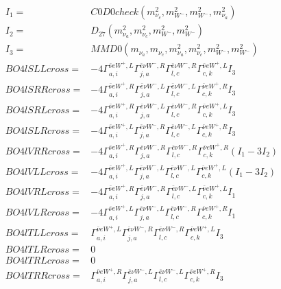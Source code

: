 \documentclass[A4,landscape]{article}
\begin{document}
\begin{align} 
I_1 = & C0D0check(m^2_{\nu_{{c}}}, m^2_{W^-}, m^2_{W^-}, m^2_{\nu_{{a}}}) \\ 
I_2 = & D_{27}(m^2_{\nu_{{a}}}, m^2_{\nu_{{c}}}, m^2_{W^-}, m^2_{W^-}) \\ 
I_3 = & MMD0(m_{\nu_{{a}}}, m_{\nu_{{c}}}, m^2_{\nu_{{a}}}, m^2_{\nu_{{c}}}, m^2_{W^-}, m^2_{W^-}) \\ 
  BO4lSLLcross= & -4  \Gamma^{\bar{\nu}e W^+,L}_{a, i} \Gamma^{\bar{e}\nu W^- ,R}_{j, a} \Gamma^{\bar{e}\nu W^- ,R}_{l, c} \Gamma^{\bar{\nu}e W^+,L}_{c, k} I_3 \\ 
  BO4lSRRcross= & -4  \Gamma^{\bar{\nu}e W^+,R}_{a, i} \Gamma^{\bar{e}\nu W^- ,L}_{j, a} \Gamma^{\bar{e}\nu W^- ,L}_{l, c} \Gamma^{\bar{\nu}e W^+,R}_{c, k} I_3 \\ 
  BO4lSRLcross= & -4  \Gamma^{\bar{\nu}e W^+,R}_{a, i} \Gamma^{\bar{e}\nu W^- ,L}_{j, a} \Gamma^{\bar{e}\nu W^- ,R}_{l, c} \Gamma^{\bar{\nu}e W^+,L}_{c, k} I_3 \\ 
  BO4lSLRcross= & -4  \Gamma^{\bar{\nu}e W^+,L}_{a, i} \Gamma^{\bar{e}\nu W^- ,R}_{j, a} \Gamma^{\bar{e}\nu W^- ,L}_{l, c} \Gamma^{\bar{\nu}e W^+,R}_{c, k} I_3 \\ 
  BO4lVRRcross= & -4  \Gamma^{\bar{\nu}e W^+,R}_{a, i} \Gamma^{\bar{e}\nu W^- ,R}_{j, a} \Gamma^{\bar{e}\nu W^- ,R}_{l, c} \Gamma^{\bar{\nu}e W^+,R}_{c, k} (I_1 - 3 I_2) \\ 
  BO4lVLLcross= & -4  \Gamma^{\bar{\nu}e W^+,L}_{a, i} \Gamma^{\bar{e}\nu W^- ,L}_{j, a} \Gamma^{\bar{e}\nu W^- ,L}_{l, c} \Gamma^{\bar{\nu}e W^+,L}_{c, k} (I_1 - 3 I_2) \\ 
  BO4lVRLcross= & -4  \Gamma^{\bar{\nu}e W^+,R}_{a, i} \Gamma^{\bar{e}\nu W^- ,R}_{j, a} \Gamma^{\bar{e}\nu W^- ,L}_{l, c} \Gamma^{\bar{\nu}e W^+,L}_{c, k} I_1 \\ 
  BO4lVLRcross= & -4  \Gamma^{\bar{\nu}e W^+,L}_{a, i} \Gamma^{\bar{e}\nu W^- ,L}_{j, a} \Gamma^{\bar{e}\nu W^- ,R}_{l, c} \Gamma^{\bar{\nu}e W^+,R}_{c, k} I_1 \\ 
  BO4lTLLcross= &  \Gamma^{\bar{\nu}e W^+,L}_{a, i} \Gamma^{\bar{e}\nu W^- ,R}_{j, a} \Gamma^{\bar{e}\nu W^- ,R}_{l, c} \Gamma^{\bar{\nu}e W^+,L}_{c, k} I_3 \\ 
  BO4lTLRcross= & 0 \\ 
  BO4lTRLcross= & 0 \\ 
  BO4lTRRcross= &  \Gamma^{\bar{\nu}e W^+,R}_{a, i} \Gamma^{\bar{e}\nu W^- ,L}_{j, a} \Gamma^{\bar{e}\nu W^- ,L}_{l, c} \Gamma^{\bar{\nu}e W^+,R}_{c, k} I_3 \\ 
\end{align} 
\end{document}
